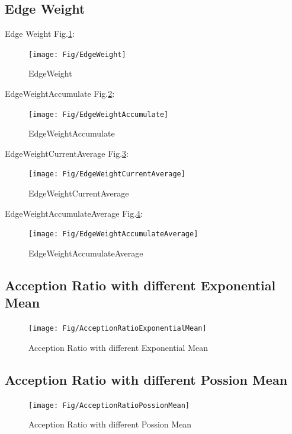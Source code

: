 \subsection{Edge Weight}
Edge Weight Fig.\ref{fig:EdgeWeight}:
\begin{figure}[htbp]
  \centering
  \texttt{[image: Fig/EdgeWeight]}\\
  \caption{EdgeWeight}\label{fig:EdgeWeight}
\end{figure}
EdgeWeightAccumulate  Fig.\ref{fig:EdgeWeightAccumulate}:
\begin{figure}[htbp]
  \centering
  \texttt{[image: Fig/EdgeWeightAccumulate]}\\
  \caption{EdgeWeightAccumulate}\label{fig:EdgeWeightAccumulate}
\end{figure}

EdgeWeightCurrentAverage Fig.\ref{fig:EdgeWeightCurrentAverage}:
\begin{figure}[htbp]
  \centering
  \texttt{[image: Fig/EdgeWeightCurrentAverage]}\\
  \caption{EdgeWeightCurrentAverage}\label{fig:EdgeWeightCurrentAverage}
\end{figure}

EdgeWeightAccumulateAverage Fig.\ref{fig:EdgeWeightAccumulateAverage}:
\begin{figure}[htbp]
  \centering
  \texttt{[image: Fig/EdgeWeightAccumulateAverage]}\\
  \caption{EdgeWeightAccumulateAverage}\label{fig:EdgeWeightAccumulateAverage}
\end{figure}


\subsection{Acception Ratio with different Exponential Mean}
\begin{figure}[htbp]
  \centering
  \texttt{[image: Fig/AcceptionRatioExponentialMean]}\\
  \caption{Acception Ratio with different Exponential Mean}\label{fig:AcceptionRatioExponentialMean}
\end{figure}

\subsection{Acception Ratio with different Possion Mean}
\begin{figure}[htbp]
  \centering
  \texttt{[image: Fig/AcceptionRatioPossionMean]}\\
  \caption{Acception Ratio with different Possion Mean}\label{fig:AcceptionRatioPossionMean}
\end{figure}

